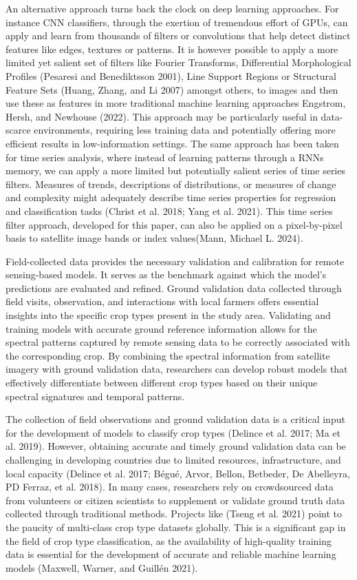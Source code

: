\documentclass[
]{article}
\begin{document}
An alternative approach turns back the clock on deep learning
approaches. For instance CNN classifiers, through the exertion of
tremendous effort of GPUs, can apply and learn from thousands of filters
or convolutions that help detect distinct features like edges, textures
or patterns. It is however possible to apply a more limited yet salient
set of filters like Fourier Transforms, Differential Morphological
Profiles (Pesaresi and Benediktsson 2001), Line Support Regions or
Structural Feature Sets (Huang, Zhang, and Li 2007) amongst others, to
images and then use these as features in more traditional machine
learning approaches Engstrom, Hersh, and Newhouse (2022). This approach
may be particularly useful in data-scarce environments, requiring less
training data and potentially offering more efficient results in
low-information settings. The same approach has been taken for time
series analysis, where instead of learning patterns through a RNNs
memory, we can apply a more limited but potentially salient series of
time series filters. Measures of trends, descriptions of distributions,
or measures of change and complexity might adequately describe time
series properties for regression and classification tasks (Christ et al.
2018; Yang et al. 2021). This time series filter approach, developed for
this paper, can also be applied on a pixel-by-pixel basis to satellite
image bands or index values(Mann, Michael L. 2024).

Field-collected data provides the necessary validation and calibration
for remote sensing-based models. It serves as the benchmark against
which the model's predictions are evaluated and refined. Ground
validation data collected through field visits, observation, and
interactions with local farmers offers essential insights into the
specific crop types present in the study area. Validating and training
models with accurate ground reference information allows for the
spectral patterns captured by remote sensing data to be correctly
associated with the corresponding crop. By combining the spectral
information from satellite imagery with ground validation data,
researchers can develop robust models that effectively differentiate
between different crop types based on their unique spectral signatures
and temporal patterns.

The collection of field observations and ground validation data is a
critical input for the development of models to classify crop types
(Delince et al. 2017; Ma et al. 2019). However, obtaining accurate and
timely ground validation data can be challenging in developing countries
due to limited resources, infrastructure, and local capacity (Delince et
al. 2017; Bégué, Arvor, Bellon, Betbeder, De Abelleyra, PD Ferraz, et
al. 2018). In many cases, researchers rely on crowdsourced data from
volunteers or citizen scientists to supplement or validate ground truth
data collected through traditional methods. Projects like (Tseng et al.
2021) point to the paucity of multi-class crop type datasets globally.
This is a significant gap in the field of crop type classification, as
the availability of high-quality training data is essential for the
development of accurate and reliable machine learning models (Maxwell,
Warner, and Guillén 2021).
\end{document}
